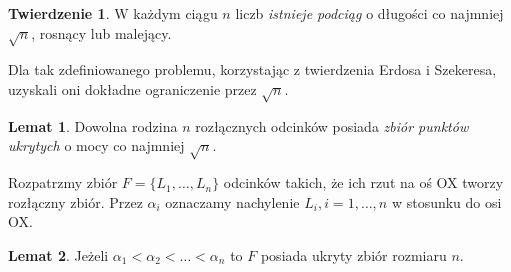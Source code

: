 \documentclass[brudnopis]{xmgr}
\theoremstyle{definition}
\newtheorem{Twierdzenie}{Twierdzenie}
\newtheorem{Lemat}{Lemat}
\begin{document}
\begin{Twierdzenie}\label{podciag rosnacy} \cite{illumination}
  W każdym ciągu $n$ liczb \emph{istnieje podciąg} o długości co najmniej $\sqrt{n}$, rosnący lub malejący.
\end{Twierdzenie}

Dla tak zdefiniowanego problemu, korzystając z twierdzenia Erdosa i Szekeresa, uzyskali oni dokładne ograniczenie przez $\sqrt{n}$.
\begin{Lemat}\label{moc zbioru ukrytego tw} \cite{illumination}
  Dowolna rodzina $n$ rozłącznych odcinków posiada \emph{zbiór punktów ukrytych} o mocy co najmniej $\sqrt{n}$.
\end{Lemat}

Rozpatrzmy zbiór $F = \{L_1,\ldots,L_n\}$ odcinków takich, że ich rzut na oś OX tworzy rozłączny zbiór. Przez $\alpha_i$ oznaczamy nachylenie $L_i, i = 1,\ldots,n$ w stosunku do osi OX.
\begin{Lemat}\label{zbior ukryty}
  Jeżeli $\alpha_1 < \alpha_2 < \ldots < \alpha_n$ to $F$ posiada ukryty zbiór rozmiaru $n$.
\end{Lemat}
\end{document}

